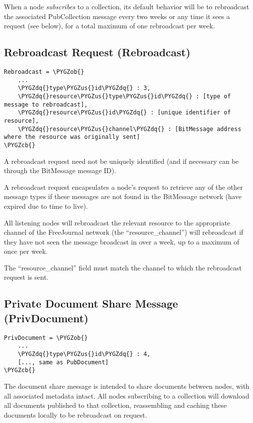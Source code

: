 \documentclass[letterpaper,10pt,oneside]{sphinxmanual}
\def\PYGZus{\char`\_}
\def\PYGZob{\char`\{}
\def\PYGZcb{\char`\}}
\def\PYGZdq{\char`\"}
\begin{document}
When a node \emph{subscribes} to a collection, its default behavior will be to rebroadcast the associated PubCollection message every
two weeks or any time it sees a request (see below), for a total maximum of one rebroadcast per week.


\subsection{Rebroadcast Request (Rebroadcast)}
\label{protocol:rebroadcast-request-rebroadcast}
\begin{Verbatim}[commandchars=\\\{\}]
Rebroadcast = \PYGZob{}
    ...
    \PYGZdq{}type\PYGZus{}id\PYGZdq{} : 3,
    \PYGZdq{}resource\PYGZus{}type\PYGZus{}id\PYGZdq{} : [type of message to rebroadcast],
    \PYGZdq{}resource\PYGZus{}id\PYGZdq{} : [unique identifier of resource],
    \PYGZdq{}resource\PYGZus{}channel\PYGZdq{} : [BitMessage address where the resource was originally sent]
\PYGZcb{}
\end{Verbatim}

A rebroadcast request need not be uniquely identified (and if necessary can be through the BitMessage message ID).

A rebroadcast request encapsulates a node's request to retrieve any of the other message types if these messages are not found
in the BitMessage network (have expired due to time to live).

All listening nodes will rebroadcast the relevant resource to the appropriate channel of the FreeJournal network (the
``resource\_channel'') will rebroadcast if they have not seen the message broadcast in over a week, up to a maximum of once per
week.

The ``resource\_channel'' field must match the channel to which the rebroadcast request is sent.


\subsection{Private Document Share Message (PrivDocument)}
\label{protocol:private-document-share-message-privdocument}
\begin{Verbatim}[commandchars=\\\{\}]
PrivDocument = \PYGZob{}
    ...
    \PYGZdq{}type\PYGZus{}id\PYGZdq{} : 4,
    [..., same as PubDocument]
\PYGZcb{}
\end{Verbatim}

The document share message is intended to share documents between nodes, with all associated metadata intact.  All nodes
subscribing to a collection will download all documents published to that collection, reassembling and caching these documents
locally to be rebroadcast on request.
\end{document}
